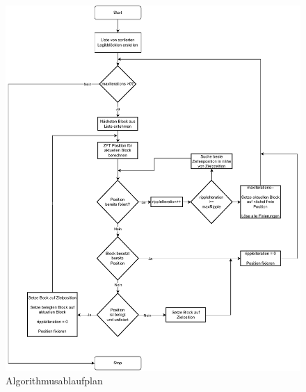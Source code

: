         \begin{figure}[H]
            \centering
            \includegraphics[width=\textwidth]{img/flowchart.pdf}
            \caption{Algorithmusablaufplan}
            \label{fig:algo-flowchart}
        \end{figure}
